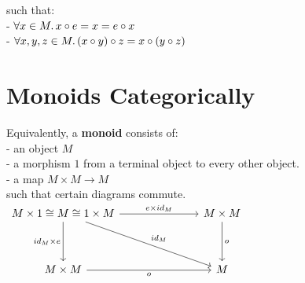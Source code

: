 \documentclass[a4paper, twoside, english, 11pt]{book}
\begin{document}
\noindent
such that: \\

- $\forall x \in M \ldotp x \circ e = x = e \circ x$ \\

- $\forall x, y, z \in M \ldotp (x \circ y) \circ z = x \circ (y \circ z)$



\section{Monoids Categorically}

Equivalently, a \textbf{monoid} consists of: \\

- an object $M$ \\

- a morphism $1$ from a terminal object to every other object. \\ %

- a map $M \times M \rightarrow M$ \\

such that certain diagrams commute. \\

$\begin{tikzcd}
M \times 1 \cong M \cong 1 \times M \arrow[dd, "id_M \times e"'] \arrow[rrr, "e \times id_M"] \arrow[rrrdd, "id_M"] &  &  & M \times M \arrow[dd, "o"] \\
                                                                                                                    &  &  &                            \\
M \times M \arrow[rrr, "o"']                                                                                        &  &  & M
\end{tikzcd}$ \\
\end{document}
